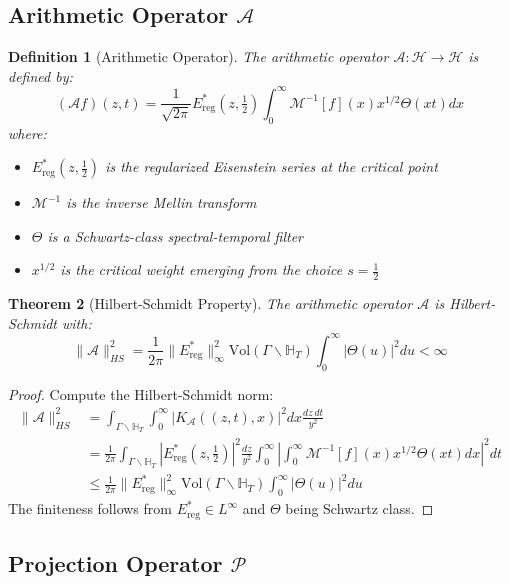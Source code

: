 \documentclass[11pt]{article}
\theoremstyle{plain}
\newtheorem{theorem}{Theorem}[section]
\newtheorem{definition}[theorem]{Definition}
\theoremstyle{remark}
\newcommand{\H}{\mathbb{H}}
\newcommand{\Vol}{\text{Vol}}
\newcommand{\cH}{\mathcal{H}}
\newcommand{\cA}{\mathcal{A}}
\newcommand{\cP}{\mathcal{P}}
\newcommand{\EisReg}{E^*_{\text{reg}}}
\newcommand{\Mellin}{\mathcal{M}}
\begin{document}
\subsection{Arithmetic Operator $\cA$}

\begin{definition}[Arithmetic Operator]
The arithmetic operator $\cA: \cH \to \cH$ is defined by:
\[
(\cA f)(z,t) = \frac{1}{\sqrt{2\pi}} \EisReg(z,\tfrac{1}{2}) \int_0^\infty \Mellin^{-1}[f](x) x^{1/2} \Theta(xt)  dx
\]
where:
\begin{itemize}
\item $\EisReg(z,\tfrac{1}{2})$ is the regularized Eisenstein series at the critical point
\item $\Mellin^{-1}$ is the inverse Mellin transform
\item $\Theta$ is a Schwartz-class spectral-temporal filter
\item $x^{1/2}$ is the critical weight emerging from the choice $s = \tfrac{1}{2}$
\end{itemize}
\end{definition}

\begin{theorem}[Hilbert-Schmidt Property]
The arithmetic operator $\cA$ is Hilbert-Schmidt with:
\[
\|\cA\|_{HS}^2 = \frac{1}{2\pi} \|\EisReg\|_\infty^2 \Vol(\Gamma \backslash \H_T) \int_0^\infty |\Theta(u)|^2 du < \infty
\]
\end{theorem}

\begin{proof}
Compute the Hilbert-Schmidt norm:
\begin{align*}
\|\cA\|_{HS}^2 &= \int_{\Gamma \backslash \H_T} \int_0^\infty |K_{\cA}((z,t), x)|^2  dx \frac{dz\,dt}{y^2} \\
&= \frac{1}{2\pi} \int_{\Gamma \backslash \H_T} |\EisReg(z,\tfrac{1}{2})|^2 \frac{dz}{y^2} \int_0^\infty \left|\int_0^\infty \Mellin^{-1}[f](x) x^{1/2} \Theta(xt)  dx\right|^2 dt \\
&\leq \frac{1}{2\pi} \|\EisReg\|_\infty^2 \Vol(\Gamma \backslash \H_T) \int_0^\infty |\Theta(u)|^2 du
\end{align*}
The finiteness follows from $\EisReg \in L^\infty$ and $\Theta$ being Schwartz class.
\end{proof}

\subsection{Projection Operator $\cP$}
\end{document}
